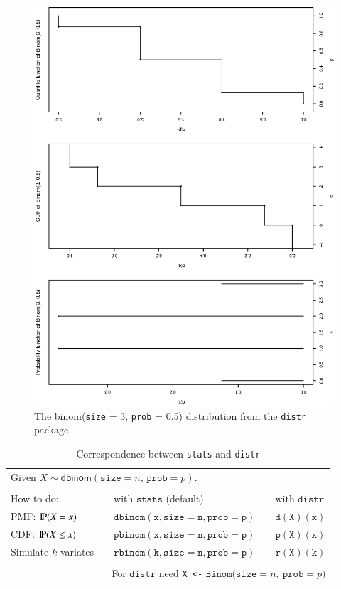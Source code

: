 \documentclass[captions=tableheading]{scrbook}
\begin{document}
\begin{figure}[th]
    \includegraphics[angle=270, totalheight=4in]{img/binom-plot-distr.ps}
    \caption[The \textsf{binom}(\texttt{size} = 3, \texttt{prob} = 0.5) distribution from the \texttt{distr} package]{\small The \textsf{binom}(\texttt{size} = 3, \texttt{prob} = 0.5) distribution from the \texttt{distr} package.}
    \label{fig:binom-plot-distr}
  \end{figure}

\begin{table}
\begin{tabular}{lllll}
\multicolumn{5}{l}{Given \(X\sim\mathsf{dbinom}(\mathtt{size}=n,\,\mathtt{prob}=p)\).}\tabularnewline
 &  &  &  & \tabularnewline
How to do: &  & with \(\mathtt{stats}\) (default)  &  & with \(\mathtt{distr}\)\tabularnewline
\hline
PMF: \(\P(X=x)\) &  & \(\mathtt{dbinom(x,size=n,prob=p)}\) &  & \(\mathtt{d(X)(x)}\)\tabularnewline
CDF: \(\P(X\leq x)\) &  & \(\mathtt{pbinom(x,size=n,prob=p)}\) &  & \(\mathtt{p(X)(x)}\)\tabularnewline
Simulate \(k\) variates &  & \(\mathtt{rbinom(k,size=n,prob=p)}\) &  & \(\mathtt{r(X)(k)}\)\tabularnewline
\hline
 &  &  &  & \tabularnewline
\multicolumn{5}{r}{For \(\mathtt{distr}\) need \texttt{X <-} \(\mathtt{Binom(size=}n\mathtt{,\ prob=}p\mathtt{)}\)}\tabularnewline
\end{tabular}
\caption{Correspondence between \texttt{stats} and \texttt{distr}}
\end{table}
\end{document}
